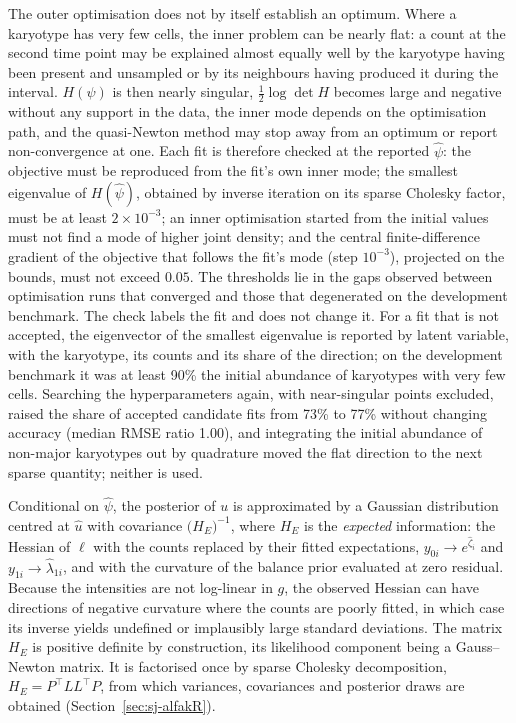 \documentclass[11pt]{article}
\begin{document}
The outer optimisation does not by itself establish an optimum. Where a
karyotype has very few cells, the inner problem can be nearly flat: a count at
the second time point may be explained almost equally well by the karyotype having
been present and unsampled or by its neighbours having produced it during the
interval. $H(\psi)$ is then nearly singular, $\tfrac12\log\det H$ becomes
large and negative without any support in the data, the inner mode depends on
the optimisation path, and the quasi-Newton method may stop away from an
optimum or report non-convergence at one. Each fit is therefore checked at
the reported $\hat\psi$: the objective must be reproduced from the fit's own
inner mode; the smallest eigenvalue of $H(\hat\psi)$, obtained by inverse
iteration on its sparse Cholesky factor, must be at least $2\times10^{-3}$;
an inner optimisation started from the initial values must not find a mode of
higher joint density; and the central finite-difference gradient of the
objective that follows the fit's mode (step $10^{-3}$), projected on the
bounds, must not exceed $0.05$. The thresholds lie in the gaps observed
between optimisation runs that converged and those that degenerated on the
development benchmark. The check labels the fit and does not change it. For
a fit that is not accepted, the eigenvector of the smallest eigenvalue is
reported by latent variable, with the karyotype, its counts and its share of
the direction; on the development benchmark it was at least 90\% the initial
abundance of karyotypes with very few cells. Searching the hyperparameters
again, with near-singular points excluded, raised the share of accepted
candidate fits from 73\% to 77\% without changing accuracy (median RMSE ratio
1.00), and integrating the initial abundance of non-major karyotypes out by
quadrature moved the flat direction to the next sparse quantity; neither is
used.

Conditional on $\hat\psi$, the posterior of $u$ is approximated by a Gaussian
distribution centred at $\hat u$ with covariance $\bigl(H_E\bigr)^{-1}$,
where $H_E$ is the \emph{expected} information: the Hessian of $\ell$ with the
counts replaced by their fitted expectations, $y_{0i}\to e^{\hat\zeta_i}$ and
$y_{1i}\to\hat\lambda_{1i}$, and with the curvature of the balance prior
evaluated at zero residual. Because the intensities are not log-linear in $g$,
the observed Hessian can have directions of negative curvature where the
counts are poorly fitted, in which case its inverse yields undefined or
implausibly large standard deviations. The matrix $H_E$ is positive definite
by construction, its likelihood component being a Gauss--Newton matrix. It is
factorised once by sparse Cholesky decomposition, $H_E=P^\top LL^\top P$,
from which variances, covariances and posterior draws are obtained
(Section~\ref{sec:sj-alfakR}).
\end{document}

